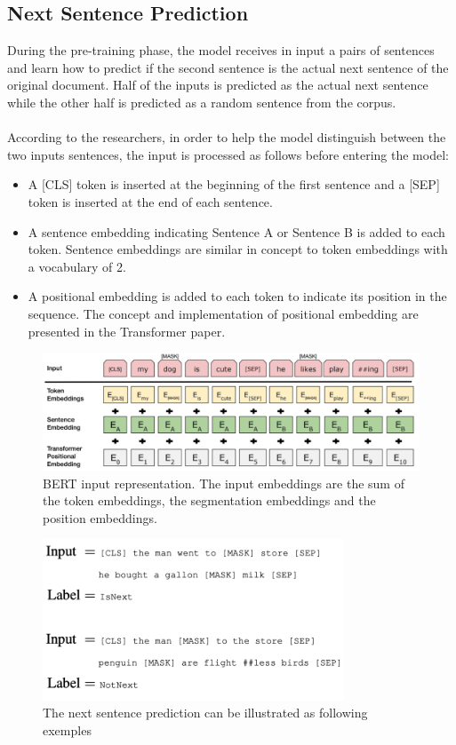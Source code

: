 \subsection{Next Sentence Prediction}
During the pre-training phase, the model receives in input a pairs of sentences and learn how to predict if the second sentence is the actual next sentence of the original document. Half of the inputs is predicted as the actual next sentence while the other half is predicted as a random sentence from the corpus.\\
\\
According to the researchers, in order to help the model distinguish between the two inputs sentences, the input is processed as follows before entering the model:
\begin{itemize}

    \item A [CLS] token is inserted at the beginning of the first sentence and a [SEP] token is inserted at the end of each sentence.
    \item A sentence embedding indicating Sentence A or Sentence B is added to each token. Sentence embeddings are similar in concept to token embeddings with a vocabulary of 2.
    \item A positional embedding is added to each token to indicate its position in the sequence. The concept and implementation of positional embedding are presented in the Transformer paper.
\end{itemize}

\begin{figure}[h]
    \centering
    \includegraphics[width=1\textwidth]{NSP.png}
    \caption{BERT \cite{Devlin2018} input representation. The input embeddings are the sum of the token embeddings, the segmentation embeddings and the position embeddings.}
    \label{fig:NSP1}
\end{figure}

\begin{figure}[h]
    \centering
    \includegraphics[width=0.8\textwidth]{NSP2.png}
    \caption{The next sentence prediction can be illustrated as following exemples \cite{Devlin2018}}
    \label{fig:NSP2}
\end{figure}

